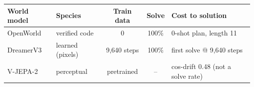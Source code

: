 \begin{tabular}{llccl}
\toprule
World model & Species & Train data & Solve & Cost to solution \\
\midrule
OpenWorld & verified code & 0 & 100\% & 0-shot plan, length 11 \\
DreamerV3 & learned (pixels) & 9{,}640 steps & 100\% & first solve @ 9{,}640 steps \\
V-JEPA-2 & perceptual & pretrained & -- & cos-drift 0.48 (not a solve rate) \\
\bottomrule
\end{tabular}
